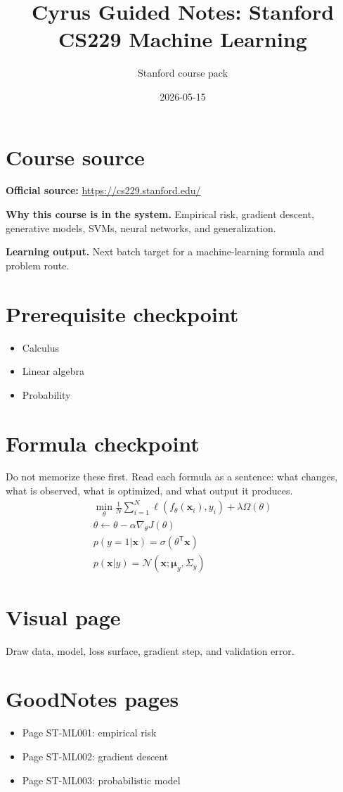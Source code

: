 \documentclass[11pt]{article}
\title{Cyrus Guided Notes: Stanford CS229 Machine Learning}
\author{Stanford course pack}
\date{2026-05-15}
\begin{document}
\maketitle

\section*{Course source}
\textbf{Official source:} \url{https://cs229.stanford.edu/}

\textbf{Why this course is in the system.} Empirical risk, gradient descent, generative models, SVMs, neural networks, and generalization.

\textbf{Learning output.} Next batch target for a machine-learning formula and problem route.

\section*{Prerequisite checkpoint}
\begin{itemize}[leftmargin=1.4em]
  \item Calculus
  \item Linear algebra
  \item Probability
\end{itemize}

\section*{Formula checkpoint}
Do not memorize these first. Read each formula as a sentence: what changes, what is observed, what is optimized, and what output it produces.
\begin{align*}
  \min_{\theta}\frac{1}{N}\sum_{i=1}^{N}\ell(f_{\theta}(\bm{x}_i),y_i)+\lambda\Omega(\theta)\\
  \theta\leftarrow\theta-\alpha\nabla_{\theta}J(\theta)\\
  p(y=1|\bm{x})=\sigma(\theta^{\mathsf T}\bm{x})\\
  p(\bm{x}|y)=\mathcal{N}(\bm{x};\bm{\mu}_y,\Sigma_y)
\end{align*}

\section*{Visual page}
Draw data, model, loss surface, gradient step, and validation error.

\section*{GoodNotes pages}
\begin{itemize}[leftmargin=1.4em]
  \item Page ST-ML001: empirical risk
  \item Page ST-ML002: gradient descent
  \item Page ST-ML003: probabilistic model
\end{itemize}
\end{document}

